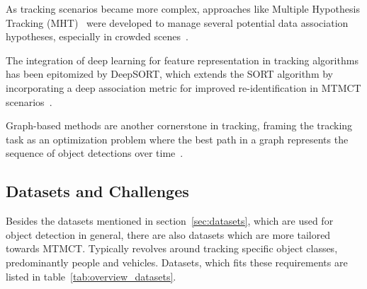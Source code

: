 As tracking scenarios became more complex, approaches like Multiple Hypothesis Tracking (MHT)~\cite{Blackman04} were developed to manage several potential data association hypotheses, especially in crowded scenes~\cite{Reid79}.

The integration of deep learning for feature representation in tracking algorithms has been epitomized by DeepSORT, which extends the SORT algorithm by incorporating a deep association metric for improved re-identification in MTMCT scenarios~\cite{Wojke17}.

Graph-based methods are another cornerstone in tracking, framing the tracking task as an optimization problem where the best path in a graph represents the sequence of object detections over time~\cite{Zhang08}.

\subsection{Datasets and Challenges}\label{subsec:datasets_and_challenges}
Besides the datasets mentioned in section~\ref{sec:datasets}, which are used for object detection in general, there are also datasets which are more tailored towards MTMCT. Typically revolves around tracking specific object classes, predominantly people and vehicles. Datasets, which fits these requirements are listed in table~\ref{tab:overview_datasets}.

